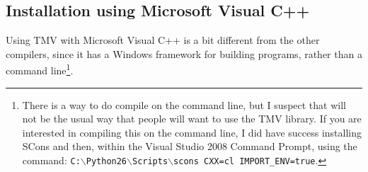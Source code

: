 \documentclass[twoside,letterpaper,11pt]{article}
\begin{document}
\subsection{Installation using Microsoft Visual C++}
\label{Install_Microsoft}

Using TMV with Microsoft Visual C++ is a bit different from the other compilers,
since it has a Windows framework for building programs, rather than a command 
line\footnote{
There is a way to do compile on the command line, but I suspect that will not be the 
usual way that people will want to use the TMV library.  If you are interested in compiling
this on the command line, I did have success installing SCons and then, within the
Visual Studio 2008 Command Prompt, using the command:
\texttt{C:$\backslash$Python26$\backslash$Scripts$\backslash$scons CXX=cl IMPORT\_ENV=true}.}.
\end{document}
